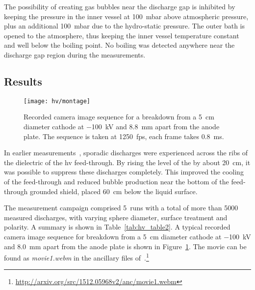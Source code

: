 The possibility of creating gas bubbles near the discharge gap is inhibited by keeping the pressure in the inner vessel at \SI{100}{\milli\bar} above atmospheric pressure, plus an additional \SI{100}{\milli\bar} due to the hydro-static pressure.
The outer bath is opened to the atmosphere, thus keeping the inner vessel temperature constant and well below the boiling point.
No boiling was detected anywhere near the discharge gap region during the measurements.


\subsection{Results}
\label{sec:studies_hv_results}

\begin{figure}[htb]
	\centering	
	\texttt{[image: hv/montage]}
	\caption{Recorded camera image sequence for a breakdown from a \SI{5}{\centi\metre} diameter cathode at \SI{-100}{\kilo\volt} and \SI{8.8}{\milli\metre} apart from the anode plate. The sequence is taken at \SI{1250}{fps}, each frame takes \SI{0.8}{\milli\second}.}
	\label{fig:hv_images}
\end{figure}

In earlier measurements~\cite{breakdown_14}, sporadic discharges were experienced across the ribs of the dielectric of the \gls{hv} feed-through.
By rising the level of the \lar{} by about \SI{20}{\centi\metre}, it was possible to suppress these discharges completely.
This improved the cooling of the feed-through and reduced bubble production near the bottom of the feed-through grounded shield, placed \SI{60}{\centi\metre} below the liquid surface. 

The measurement campaign comprised \num{5}~runs with a total of more than \num{5000} measured discharges, with varying sphere diameter, surface treatment and polarity.
A summary is shown in Table~\ref{tab:hv_table2}.
A typical recorded camera image sequence for breakdown from a \SI{5}{\centi\metre} diameter cathode at \SI{-100}{\kilo\volt} and \SI{8.0}{\milli\metre} apart from the anode plate is shown in Figure~\ref{fig:hv_images}.
The movie can be found as \emph{movie1.webm} in the ancillary files of~\cite{breakdown_16}.\footnote{\url{http://arxiv.org/src/1512.05968v2/anc/movie1.webm}}

